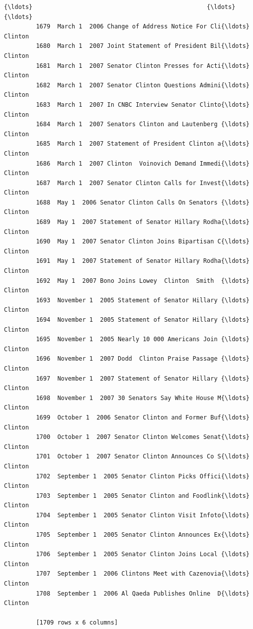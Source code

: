 \documentclass[11pt]{article}
\begin{document}
\begin{Verbatim}[commandchars=\\\{\}]
         {\ldots}                                                 {\ldots}           {\ldots}  
         1679  March 1  2006 Change of Address Notice For Cli{\ldots}       Clinton  
         1680  March 1  2007 Joint Statement of President Bil{\ldots}       Clinton  
         1681  March 1  2007 Senator Clinton Presses for Acti{\ldots}       Clinton  
         1682  March 1  2007 Senator Clinton Questions Admini{\ldots}       Clinton  
         1683  March 1  2007 In CNBC Interview Senator Clinto{\ldots}       Clinton  
         1684  March 1  2007 Senators Clinton and Lautenberg {\ldots}       Clinton  
         1685  March 1  2007 Statement of President Clinton a{\ldots}       Clinton  
         1686  March 1  2007 Clinton  Voinovich Demand Immedi{\ldots}       Clinton  
         1687  March 1  2007 Senator Clinton Calls for Invest{\ldots}       Clinton  
         1688  May 1  2006 Senator Clinton Calls On Senators {\ldots}       Clinton  
         1689  May 1  2007 Statement of Senator Hillary Rodha{\ldots}       Clinton  
         1690  May 1  2007 Senator Clinton Joins Bipartisan C{\ldots}       Clinton  
         1691  May 1  2007 Statement of Senator Hillary Rodha{\ldots}       Clinton  
         1692  May 1  2007 Bono Joins Lowey  Clinton  Smith  {\ldots}       Clinton  
         1693  November 1  2005 Statement of Senator Hillary {\ldots}       Clinton  
         1694  November 1  2005 Statement of Senator Hillary {\ldots}       Clinton  
         1695  November 1  2005 Nearly 10 000 Americans Join {\ldots}       Clinton  
         1696  November 1  2007 Dodd  Clinton Praise Passage {\ldots}       Clinton  
         1697  November 1  2007 Statement of Senator Hillary {\ldots}       Clinton  
         1698  November 1  2007 30 Senators Say White House M{\ldots}       Clinton  
         1699  October 1  2006 Senator Clinton and Former Buf{\ldots}       Clinton  
         1700  October 1  2007 Senator Clinton Welcomes Senat{\ldots}       Clinton  
         1701  October 1  2007 Senator Clinton Announces Co S{\ldots}       Clinton  
         1702  September 1  2005 Senator Clinton Picks Offici{\ldots}       Clinton  
         1703  September 1  2005 Senator Clinton and Foodlink{\ldots}       Clinton  
         1704  September 1  2005 Senator Clinton Visit Infoto{\ldots}       Clinton  
         1705  September 1  2005 Senator Clinton Announces Ex{\ldots}       Clinton  
         1706  September 1  2005 Senator Clinton Joins Local {\ldots}       Clinton  
         1707  September 1  2006 Clintons Meet with Cazenovia{\ldots}       Clinton  
         1708  September 1  2006 Al Qaeda Publishes Online  D{\ldots}       Clinton  
         
         [1709 rows x 6 columns]
\end{Verbatim}
            
\end{document}
